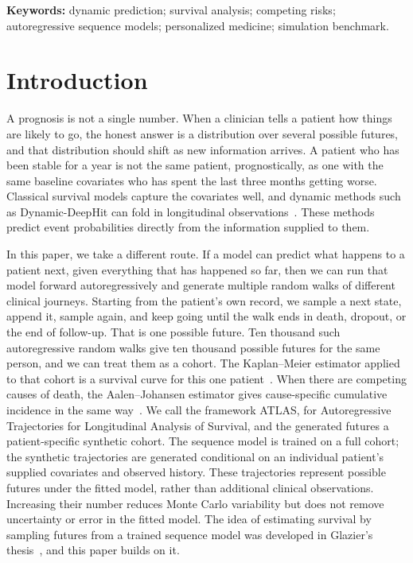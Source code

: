 \noindent\textbf{Keywords:} dynamic prediction; survival analysis; competing risks; autoregressive sequence models; personalized medicine; simulation benchmark.

\section{Introduction}
A prognosis is not a single number. When a clinician tells a patient how things are likely to go, the honest answer is a distribution over several possible futures, and that distribution should shift as new information arrives. A patient who has been stable for a year is not the same patient, prognostically, as one with the same baseline covariates who has spent the last three months getting worse. Classical survival models capture the covariates well, and dynamic methods such as Dynamic-DeepHit can fold in longitudinal observations~\citep{lee2019dynamic}. These methods predict event probabilities directly from the information supplied to them.

In this paper, we take a different route. If a model can predict what happens to a patient next, given everything that has happened so far, then we can run that model forward autoregressively and generate multiple random walks of different clinical journeys. Starting from the patient's own record, we sample a next state, append it, sample again, and keep going until the walk ends in death, dropout, or the end of follow-up. That is one possible future. Ten thousand such autoregressive random walks give ten thousand possible futures for the same person, and we can treat them as a cohort. The Kaplan--Meier estimator applied to that cohort is a survival curve for this one patient~\citep{kaplan1958}. When there are competing causes of death, the Aalen--Johansen estimator gives cause-specific cumulative incidence in the same way~\citep{aalen1978}. We call the framework ATLAS, for Autoregressive Trajectories for Longitudinal Analysis of Survival, and the generated futures a patient-specific synthetic cohort. The sequence model is trained on a full cohort; the synthetic trajectories are generated conditional on an individual patient's supplied covariates and observed history. These trajectories represent possible futures under the fitted model, rather than additional clinical observations. Increasing their number reduces Monte Carlo variability but does not remove uncertainty or error in the fitted model. The idea of estimating survival by sampling futures from a trained sequence model was developed in Glazier's thesis~\citep{glazier2019}, and this paper builds on it.

